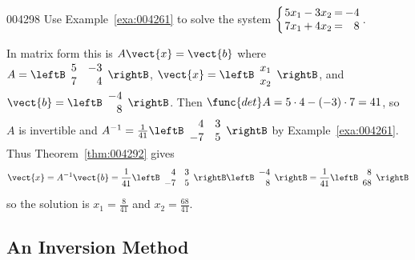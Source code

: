 \begin{example}{}{004298}
Use Example~\ref{exa:004261} to solve the system $\left\lbrace \arraycolsep=1pt \begin{array}{rrrrr}
5x_{1} & - & 3x_{2} & = & -4 \\
7x_{1} & + & 4x_{2} & = & 8
\end{array} \right.$.

\begin{solution}
  In matrix form this is $A\vect{x} = \vect{b}$ where $A = \leftB \begin{array}{rr}
  5 & -3 \\
  7 & 4
  \end{array} \rightB$, $\vect{x} = \leftB \begin{array}{c}
  x_{1} \\
  x_{2}
  \end{array} \rightB$, and $\vect{b} = \leftB \begin{array}{r}
 -4 \\
 8
 \end{array} \rightB$. Then $\func{det } A = 5 \cdot 4 - (-3) \cdot 7 = 41$, so $A$ is invertible and $A^{-1} = \frac{1}{41} \leftB \begin{array}{rr}
 4 & 3 \\
 -7 & 5
 \end{array} \rightB$
 by Example~\ref{exa:004261}. Thus Theorem~\ref{thm:004292} gives
\begin{equation*}
\vect{x} = A^{-1}\vect{b} = \frac{1}{41} \leftB \begin{array}{rr}
4 & 3 \\
-7 & 5
\end{array} \rightB \leftB \begin{array}{r}
-4 \\
8
\end{array} \rightB = \frac{1}{41} \leftB \begin{array}{r}
8 \\
68
\end{array} \rightB
\end{equation*}
so the solution is $x_{1} = \frac{8}{41}$ and $x_{2} = \frac{68}{41}$.
\end{solution}
\end{example}

\subsection*{An Inversion Method}

